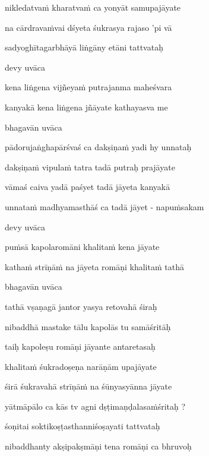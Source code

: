nikledatva\.m kharatva\.m ca yonyāt samupajāyate\thinspace{\dandab} \dontdisplaylinenum

na cārdrava\.mvai dśyeta śukrasya rajaso 'pi vā \danda\dontdisplaylinenum 

sadyoghītagarbhāyā liṅgāny etāni tattvataḥ \veg\dontdisplaylinenum

devy uvāca~{\dandab}\dontdisplaylinenum 

kena liṅgena vijñeya\.m putrajanma maheśvara\thinspace{\danda} \dontdisplaylinenum

kanyakā kena liṅgena jñāyate kathayasva me \veg\dontdisplaylinenum

bhagavān uvāca~{\dandab}\dontdisplaylinenum 

pādorujaṅghapārśvaś ca dakṣiṇa\.m yadi hy unnataḥ\thinspace{\danda} \dontdisplaylinenum

dakṣiṇa\.m vipula\.m tatra tadā putraḥ prajāyate \veg\dontdisplaylinenum

vāmaś caiva yadā paśyet tadā jāyeta kanyakā\thinspace{\dandab} \dontdisplaylinenum

unnata\.m madhyamasthāś ca tadā jāyet - napu\.msakam \veg\dontdisplaylinenum

devy uvāca~{\dandab}\dontdisplaylinenum 

pu\.msā kapolaromāni khalita\.m kena jāyate\thinspace{\danda} \dontdisplaylinenum

katha\.m strīṇā\.m na jāyeta romāṇi khalita\.m tathā \veg\dontdisplaylinenum

bhagavān uvāca~{\dandab}\dontdisplaylinenum 

tathā vṣaṇagā jantor yasya retovahā śiraḥ\thinspace{\danda} \dontdisplaylinenum

nibaddhā mastake tālu kapolās tu samāśritāḥ \veg\dontdisplaylinenum

taiḥ kapoleṣu romāṇi jāyante antaretasaḥ\thinspace{\dandab} \dontdisplaylinenum

khalita\.m śukradoṣeṇa narāṇām upajāyate \veg\dontdisplaylinenum

śirā śukravahā strīṇā\.m na śūnyasyānna jāyate\thinspace{\dandab} \dontdisplaylinenum

yātmāpālo ca kās tv agni dṣṭimaṇḍalasa\.mśritaḥ ? \veg\dontdisplaylinenum

śoṇitai soktikoṣṭasthanniśoṣayati tattvataḥ\thinspace{\dandab} \dontdisplaylinenum

nibaddhanty akṣipakṣmāṇi tena romāṇi ca bhruvoḥ \veg\dontdisplaylinenum


